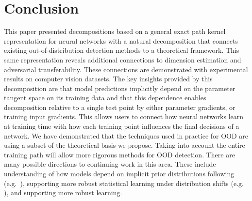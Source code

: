 \section{Conclusion}

This paper presented decompositions based on a general exact path kernel representation for neural networks with a natural decomposition that connects existing out-of-distribution detection methods to a theoretical framework. 
This same representation reveals additional connections to dimension estimation and adversarial transferability. 
These connections are demonstrated with experimental results on computer vision datasets. 
The key insights provided by this decomposition are that model predictions implicitly depend on the parameter tangent space on its training data and that this dependence enables decomposition relative to a single test point by either parameter gradients, or training input gradients. 
This allows users to connect how neural networks learn at training time with how each training point influences the final decisions of a network.
We have demonstrated that the techniques used in practice for OOD are using a subset of the theoretical basis we propose.
Taking into account the entire training path will allow more rigorous methods for OOD detection.
There are many possible directions to continuing work in this area. 
These include understanding of how models depend on implicit prior distributions following (e.g.~\citet{nagler2023}), supporting more robust statistical learning under distribution shifts (e.g. \citet{Simchowitz2023}), and supporting more robust learning.



